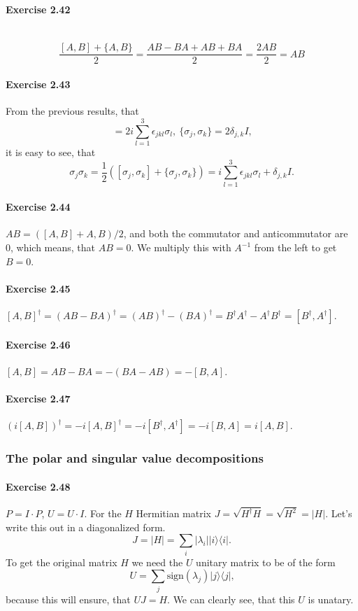 \documentclass[a4paper,12pt]{article}
\newcommand{\exercise}[1]{\paragraph{Exercise #1}}
\newcommand{\la}{\langle}
\newcommand{\ra}{\rangle}
\begin{document}
    \exercise{2.42} \
    \begin{equation}
        \frac{[A, B] + \{A, B\}}{2} = \frac{AB - BA + AB + BA}{2} = \frac{2AB}{2} = AB
    \end{equation}

    \exercise{2.43} From the previous results, that
    \begin{equation}
        [\sigma_j, \sigma_k] = 2i \sum_{l = 1}^3 \epsilon_{jkl} \sigma_l,\ \{\sigma_j, \sigma_k\} = 2 \delta_{j, k} I \textrm{,}
    \end{equation}
    it is easy to see, that
    \begin{equation}
        \sigma_j \sigma_k = \frac{1}{2} \left([\sigma_j, \sigma_k] + \{\sigma_j, \sigma_k\} \right) = i \sum_{l=1}^3 \epsilon_{jkl} \sigma_l + \delta_{j, k} I \textrm{.}
    \end{equation}

    \exercise{2.44} $AB = ([A, B] + {A, B})/2$, and both the commutator and anticommutator are 0, which means, that $AB = 0$. We multiply this with $A^{-1}$ from the left to get $B = 0$.

    \exercise{2.45} $[A, B]^\dagger = (AB - BA)^\dagger = (AB)^\dagger - (BA)^\dagger = B^\dagger A^\dagger - A^\dagger B^\dagger = [B^\dagger, A^\dagger]$.

    \exercise{2.46} $[A, B] = AB - BA = -(BA - AB) = -[B, A]$.

    \exercise{2.47} $(i[A, B])^\dagger = -i[A, B]^\dagger = -i[B^\dagger, A^\dagger] = -i[B, A] = i[A, B]$.

    \subsubsection{The polar and singular value decompositions}

    \exercise{2.48} $P = I \cdot P$, $U = U \cdot I$. For the $H$ Hermitian matrix $J = \sqrt{H^\dagger H} = \sqrt{H^2} = |H|$. Let's write this out in a diagonalized form.
    \begin{equation}
        J = |H| = \sum_i |\lambda_i| | i \ra \la i | \textrm{.}
    \end{equation}
    To get the original matrix $H$ we need the $U$ unitary matrix to be of the form
    \begin{equation}
        U = \sum_j \textrm{sign}(\lambda_j) | j \ra \la j | \textrm{,}
    \end{equation}
    because this will ensure, that $UJ = H$. We can clearly see, that this $U$ is unatary.
\end{document}
